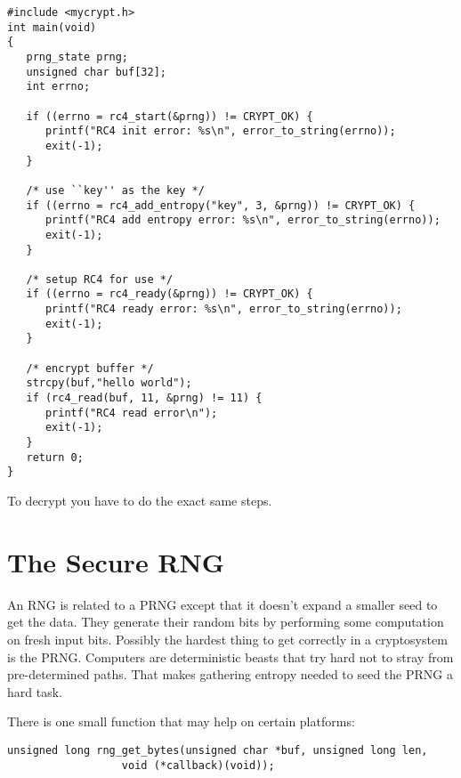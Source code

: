 \documentclass{book}
\begin{document}
\begin{small}
\begin{verbatim}
#include <mycrypt.h>
int main(void)
{
   prng_state prng;
   unsigned char buf[32];
   int errno;

   if ((errno = rc4_start(&prng)) != CRYPT_OK) {
      printf("RC4 init error: %s\n", error_to_string(errno));
      exit(-1);
   }

   /* use ``key'' as the key */
   if ((errno = rc4_add_entropy("key", 3, &prng)) != CRYPT_OK) {
      printf("RC4 add entropy error: %s\n", error_to_string(errno));
      exit(-1);
   }

   /* setup RC4 for use */
   if ((errno = rc4_ready(&prng)) != CRYPT_OK) {
      printf("RC4 ready error: %s\n", error_to_string(errno));
      exit(-1);
   }

   /* encrypt buffer */
   strcpy(buf,"hello world");
   if (rc4_read(buf, 11, &prng) != 11) {
      printf("RC4 read error\n");
      exit(-1);
   }
   return 0;
}   
\end{verbatim}
\end{small}
To decrypt you have to do the exact same steps.  

\section{The Secure RNG}
An RNG is related to a PRNG except that it doesn't expand a smaller seed to get the data.  They generate their random bits
by performing some computation on fresh input bits.  Possibly the hardest thing to get correctly in a cryptosystem is the 
PRNG.  Computers are deterministic beasts that try hard not to stray from pre-determined paths.  That makes gathering 
entropy needed to seed the PRNG a hard task.  

There is one small function that may help on certain platforms:
\begin{verbatim}
unsigned long rng_get_bytes(unsigned char *buf, unsigned long len, 
                  void (*callback)(void));
\end{verbatim}
\end{document}
